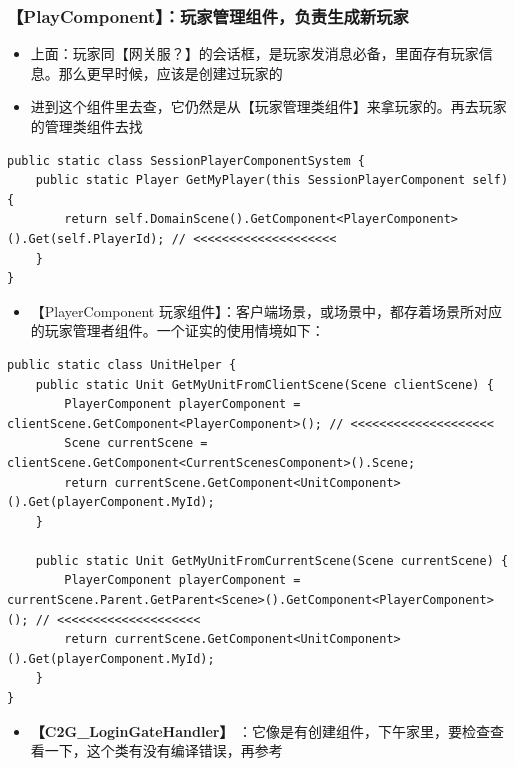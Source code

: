 \documentclass[9pt, b5paper]{article}
\begin{document}
\subsubsection{【PlayComponent】：玩家管理组件，负责生成新玩家}
\label{sec-9-5-1}
\begin{itemize}
\item 上面：玩家同【网关服？】的会话框，是玩家发消息必备，里面存有玩家信息。那么更早时候，应该是创建过玩家的
\item 进到这个组件里去查，它仍然是从【玩家管理类组件】来拿玩家的。再去玩家的管理类组件去找
\end{itemize}
\begin{verbatim}
public static class SessionPlayerComponentSystem {
    public static Player GetMyPlayer(this SessionPlayerComponent self) {
        return self.DomainScene().GetComponent<PlayerComponent>().Get(self.PlayerId); // <<<<<<<<<<<<<<<<<<<< 
    }
}
\end{verbatim}
\begin{itemize}
\item 【PlayerComponent 玩家组件】：客户端场景，或场景中，都存着场景所对应的玩家管理者组件。一个证实的使用情境如下：
\end{itemize}
\begin{verbatim}
public static class UnitHelper {
    public static Unit GetMyUnitFromClientScene(Scene clientScene) {
        PlayerComponent playerComponent = clientScene.GetComponent<PlayerComponent>(); // <<<<<<<<<<<<<<<<<<<< 
        Scene currentScene = clientScene.GetComponent<CurrentScenesComponent>().Scene;
        return currentScene.GetComponent<UnitComponent>().Get(playerComponent.MyId);
    }

    public static Unit GetMyUnitFromCurrentScene(Scene currentScene) {
        PlayerComponent playerComponent = currentScene.Parent.GetParent<Scene>().GetComponent<PlayerComponent>(); // <<<<<<<<<<<<<<<<<<<< 
        return currentScene.GetComponent<UnitComponent>().Get(playerComponent.MyId);
    }
}
\end{verbatim}
\begin{itemize}
\item \textbf{【C2G\_LoginGateHandler】} ：它像是有创建组件，下午家里，要检查查看一下，这个类有没有编译错误，再参考
\end{itemize}
\end{document}
